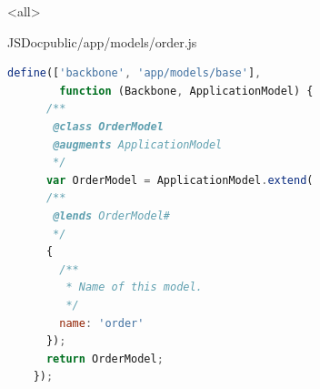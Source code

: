 \mode
<all>

{
  \frame[plain]{}
}

\begin{Frame}[fragile]{JSDoc}{public/app/models/order.js}
  \begin{lstlisting}[language=JavaScript,gobble=4]
    define(['backbone', 'app/models/base'],
        function (Backbone, ApplicationModel) {
      /**
       @class OrderModel
       @augments ApplicationModel
       */
      var OrderModel = ApplicationModel.extend(
      /**
       @lends OrderModel#
       */
      {
        /**
         * Name of this model.
         */
        name: 'order'
      });
      return OrderModel;
    });
  \end{lstlisting}
\end{Frame}


